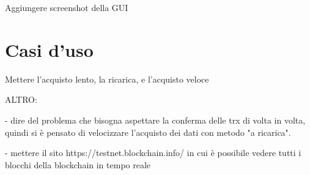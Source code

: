 Aggiungere screenshot della GUI


\section{Casi d'uso}
\label{c:integr:useCase}

Mettere l'acquisto lento, la ricarica, e l'acquisto veloce


ALTRO:

- dire del problema che bisogna aspettare la conferma delle trx di volta in volta, quindi si è pensato di velocizzare l'acquisto dei dati con metodo "a ricarica".

- mettere il sito https://testnet.blockchain.info/ in cui è possibile vedere tutti i blocchi della blockchain in tempo reale
